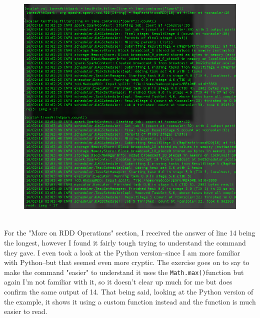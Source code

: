 \documentclass[10pt]{article}
\begin{document}
\begin{figure}[!h]
\includegraphics[scale=0.33]{linesWithSpark.png}
\centering
\end{figure}\\
\indent For the "More on RDD Operations" section, I received the answer of line 14 being the longest, however I found it fairly tough trying to understand the command they gave. I even took a look at the Python version--since I am more familiar with Python--but that seemed even more cryptic. The exercise goes on to say to make the command "easier" to understand it uses the \verb|Math.max()|function but again I'm not familiar with it, so it doesn't clear up much for me but does confirm the same output of 14. That being said, looking at the Python version of the example, it shows it using a custom function instead and the function is much easier to read.
\par
{}%
\hfill
\end{document}
